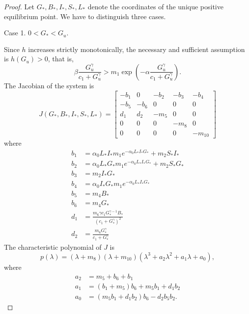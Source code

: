 \documentclass[pdflatex,sn-mathphys-num]{sn-jnl}
\theoremstyle{thmstyleone}
\theoremstyle{thmstyletwo}
\theoremstyle{thmstylethree}
\begin{document}
\begin{proof}
Let $G_{*}, B_{*}, I_{*}, S_{*}, L_{*}$ denote the coordinates of the unique positive equilibrium point. 
We have to distinguish three cases. 

Case 1. $0<G_{*}<G_u$. 

Since $h$ increases strictly monotonically, the necessary and sufficient assumption is $h(G_u)>0$, that is,
\begin{equation}
\beta\frac{G_u^{\gamma}}{c_1+G_u^{\gamma}}>m_1\exp\left(-\alpha \frac{G_u^{\gamma}}{c_1+G_u^{\gamma}}  \right).
\end{equation}
The Jacobian of the system is 
\begin{equation}
J(G_{*}, B_{*}, I_{*}, S_{*}, L_{*}) = 
\begin{bmatrix} 
-b_1 & 0 & -b_2 & -b_3 & -b_4 \\
-b_5 & -b_6 & 0 & 0 & 0 \\
d_1 & d_2 & -m_5 & 0 & 0 \\
0 & 0 & 0 & -m_8 & 0 \\
0 & 0 & 0 & 0 & -m_{10} 
\end{bmatrix}
\end{equation}
where 
\begin{align}
b_1 &=\alpha_0 L_{*} I_{*} m_1 e^{-\alpha_0 L_{*} I_{*} G_{*}} + m_2 S_{*} I_{*} \label{eq:J_entries_b1} \\
b_2 &=\alpha_0 L_{*} G_{*} m_1 e^{-\alpha_0 L_{*} I_{*} G_{*}} + m_2 S_{*} G_{*} \\
b_3 &=m_2 I_{*} G_{*} \\
b_4 &= \alpha_0 I_{*} G_{*} m_1 e^{-\alpha_0 L_{*} I_{*} G_{*}} \\
b_5 &= m_4 B_{*} \\
b_6 &= m_4 G_{*} \\
d_1 &= \frac{m_6 \gamma c_1 G_{*}^{\gamma-1} B_{*}}{(c_1 + G_{*}^{\gamma})^2} \\
d_2 &= \frac{m_6 G_{*}^{\gamma}}{c_1 + G_{*}^{\gamma}} \label{eq:J_entries_d2}
\end{align}
The characteristic polynomial of $J$ is 
\begin{equation}
p(\lambda)=(\lambda +m_8)(\lambda +m_{10})(\lambda^3+a_2\lambda^2+a_1\lambda+a_0),
\end{equation}
where
\begin{align*}
a_2 &=m_5+b_6+b_1 \\
a_1 &=(b_1+m_5)b_6+m_5b_1+d_1b_2 \\
a_0 &=(m_5b_1+d_1b_2)b_6-d_2b_5b_2.
\end{align*}

\end{proof}
\end{document}
